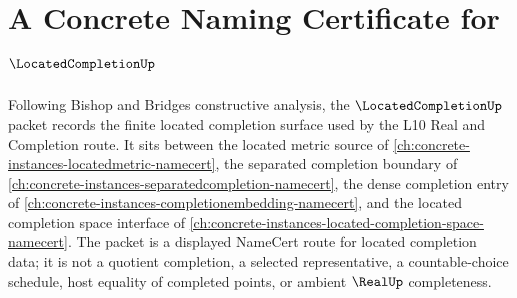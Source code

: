 \chapter{A Concrete Naming Certificate for $\LocatedCompletionUp$}
\label{ch:concrete-instances-located-completion-namecert}

Following Bishop and Bridges constructive analysis, the $\LocatedCompletionUp$ packet records the finite located completion surface used by the L10 Real and Completion route. It sits between the located metric source of \autoref{ch:concrete-instances-locatedmetric-namecert}, the separated completion boundary of \autoref{ch:concrete-instances-separatedcompletion-namecert}, the dense completion entry of \autoref{ch:concrete-instances-completionembedding-namecert}, and the located completion space interface of \autoref{ch:concrete-instances-located-completion-space-namecert}. The packet is a displayed NameCert route for located completion data; it is not a quotient completion, a selected representative, a countable-choice schedule, host equality of completed points, or ambient $\RealUp$ completeness.

